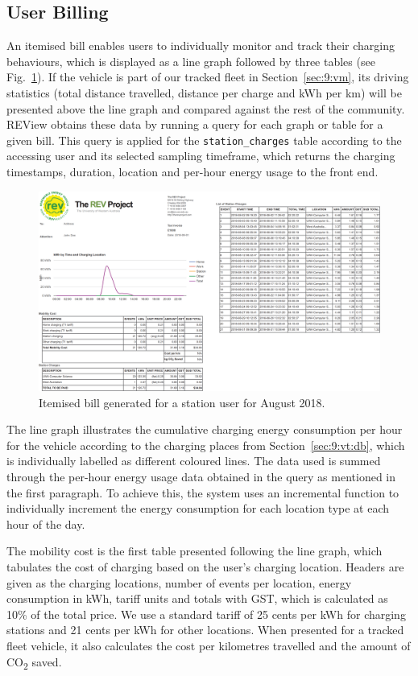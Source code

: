 \subsection{User Billing}
An itemised bill enables users to individually monitor and track their charging behaviours, which is displayed as a line graph followed by three tables (see Fig.~\ref{fig:9:uib}). If the vehicle is part of our tracked fleet in Section~\ref{sec:9:vm}, its driving statistics (total distance travelled, distance per charge and kWh per km) will be presented above the line graph and compared against the rest of the community. REView obtains these data by running a query for each graph or table for a given bill. This query is applied for the \texttt{station\_charges} table according to the accessing user and its selected sampling timeframe, which returns the charging timestamps, duration, location and per-hour energy usage to the front end.

\begin{figure}[H]
	\centering
	\includegraphics[width=\linewidth]{bill-user_1_crop}
	\caption{Itemised bill generated for a station user for August 2018.}
	\label{fig:9:uib}
\end{figure}

The line graph illustrates the cumulative charging energy consumption per hour for the vehicle according to the charging places from Section~\ref{sec:9:vt:db}, which is individually labelled as different coloured lines. The data used is summed through the per-hour energy usage data obtained in the query as mentioned in the first paragraph. To achieve this, the system uses an incremental function to individually increment the energy consumption for each location type at each hour of the day. 

The mobility cost is the first table presented following the line graph, which tabulates the cost of charging based on the user's charging location. Headers are given as the charging locations, number of events per location, energy consumption in kWh, tariff units and totals with GST, which is calculated as 10\% of the total price. We use a standard tariff of 25 cents per kWh for charging stations and 21 cents per kWh for other locations. When presented for a tracked fleet vehicle, it also calculates the cost per kilometres travelled and the amount of CO\textsubscript{2} saved. 

